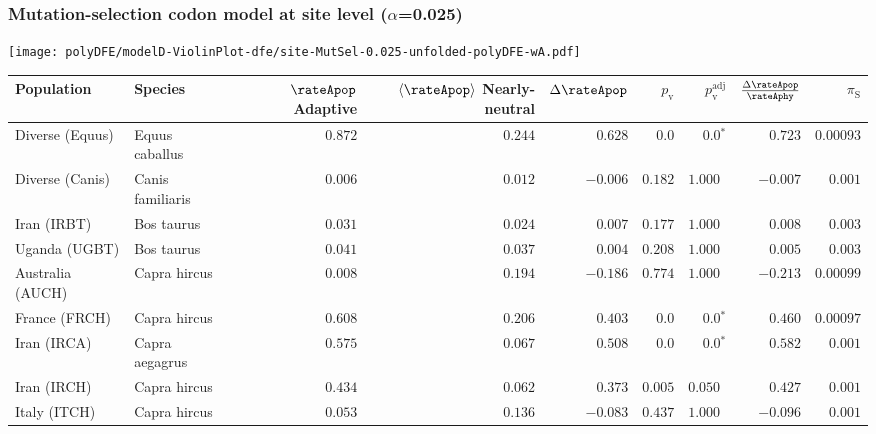 \subsubsection*{Mutation-selection codon model at site level ($\alpha$=0.025)}
\begin{center}
    \texttt{[image: polyDFE/modelD-ViolinPlot-dfe/site-MutSel-0.025-unfolded-polyDFE-wA.pdf]}
    \begin{adjustbox}{width = 1\textwidth}
        \begin{tabular}{|l|l|r|r|r|r|r|r|r|}
            \toprule
            Population & Species & \specialcell{$\rateApop$ \\ Adaptive}                & \specialcell{$\left< \rateApop \right>$ \\ Nearly-neutral}                & $\Delta \rateApop $    & $p_{\mathrm{v}}$ & $p_{\mathrm{v}}^{\mathrm{adj}}$ & $\frac{\Delta\rateApop}{\rateAphy}$ & $\pi_{\textrm{S}}$ \\
            \midrule
            Diverse (Equus)                    & Equus caballus          & $ 0.872$ & $ 0.244$ & $ 0.628$ & $0.0$ & $\bm{0.0{^*}}$     & $ 0.723$ & $0.00093$  \\
            Diverse (Canis)                  & Canis familiaris          & $ 0.006$ & $ 0.012$ & $-0.006$ & $ 0.182$ & $ 1.000~~$     & $-0.007$ & $ 0.001$ \\
            Iran (IRBT)               & Bos taurus        & $ 0.031$ & $ 0.024$ & $ 0.007$ & $ 0.177$ & $ 1.000~~$     & $ 0.008$ & $ 0.003$ \\
            Uganda (UGBT)                  & Bos taurus        & $ 0.041$ & $ 0.037$ & $ 0.004$ & $ 0.208$    & $ 1.000~~$ & $ 0.005$ & $ 0.003$ \\
            Australia (AUCH)                    & Capra hircus      & $ 0.008$ & $ 0.194$ & $-0.186$ & $ 0.774$    & $ 1.000~~$ & $-0.213$ & $0.00099$ \\
            France (FRCH)                    & Capra hircus        & $ 0.608$ & $ 0.206$ & $ 0.403$ & $0.0$ & $\bm{0.0{^*}}$     & $ 0.460$ & $0.00097$ \\
            Iran (IRCA)                   & Capra aegagrus        & $ 0.575$ & $ 0.067$ & $ 0.508$ & $0.0$ & $\bm{0.0{^*}}$     & $ 0.582$ & $ 0.001$ \\
            Iran (IRCH)                 & Capra hircus        & $ 0.434$ & $ 0.062$ & $ 0.373$ & $ 0.005$ & $ 0.050~~$     & $ 0.427$ & $ 0.001$ \\
            Italy (ITCH)                    & Capra hircus          & $ 0.053$ & $ 0.136$ & $-0.083$ & $ 0.437$ & $ 1.000~~$     & $-0.096$ & $ 0.001$  \\

\end{tabular}
\end{adjustbox}
\end{center}
